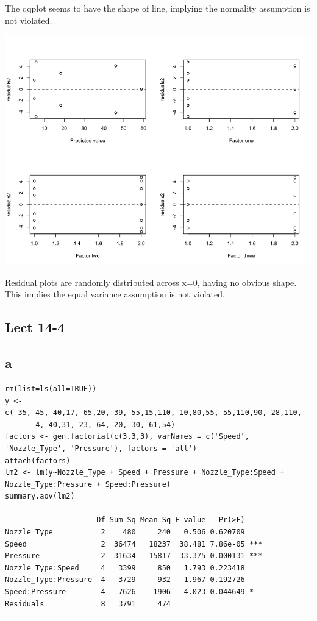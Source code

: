 \documentclass[11pt,letterpaper]{article}
\begin{document}
\noindent The qqplot seems to have the shape of line, implying the normality assumption is not violated. 

\includegraphics[scale=0.55]{lect-14-3-c-residualplot.png}

\noindent Residual plots are randomly distributed across x=0, having no obvious shape. This implies the equal variance assumption is not violated. 

\newpage
\subsection*{Lect 14-4}
\subsection*{a}
\begin{verbatim}
rm(list=ls(all=TRUE))
y <- c(-35,-45,-40,17,-65,20,-39,-55,15,110,-10,80,55,-55,110,90,-28,110,
       4,-40,31,-23,-64,-20,-30,-61,54)
factors <- gen.factorial(c(3,3,3), varNames = c('Speed', 'Nozzle_Type', 'Pressure'), factors = 'all')
attach(factors)
lm2 <- lm(y~Nozzle_Type + Speed + Pressure + Nozzle_Type:Speed + Nozzle_Type:Pressure + Speed:Pressure)
summary.aov(lm2)

                     Df Sum Sq Mean Sq F value   Pr(>F)    
Nozzle_Type           2    480     240   0.506 0.620709    
Speed                 2  36474   18237  38.481 7.86e-05 ***
Pressure              2  31634   15817  33.375 0.000131 ***
Nozzle_Type:Speed     4   3399     850   1.793 0.223418    
Nozzle_Type:Pressure  4   3729     932   1.967 0.192726    
Speed:Pressure        4   7626    1906   4.023 0.044649 *  
Residuals             8   3791     474                   
---
\end{verbatim}
\end{document}

